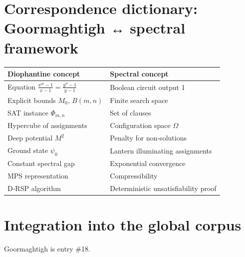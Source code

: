\documentclass[11pt,a4paper]{article}
\begin{document}
\section{Correspondence dictionary: Goormaghtigh ↔ spectral framework}

\begin{center}
\small
\begin{tabular}{@{}l|l@{}}
\toprule
\textbf{Diophantine concept} & \textbf{Spectral concept} \\
\midrule
Equation $\frac{x^{m}-1}{x-1} = \frac{y^{n}-1}{y-1}$ & Boolean circuit output 1 \\
Explicit bounds $M_0$, $B(m,n)$ & Finite search space \\
SAT instance $\Phi_{m,n}$ & Set of clauses \\
Hypercube of assignments & Configuration space $\Omega$ \\
Deep potential $M^2$ & Penalty for non‑solutions \\
Ground state $\psi_0$ & Lantern illuminating assignments \\
Constant spectral gap & Exponential convergence \\
MPS representation & Compressibility \\
D‑RSP algorithm & Deterministic unsatisfiability proof \\
\bottomrule
\end{tabular}
\end{center}

\section{Integration into the global corpus}

Goormaghtigh is entry \#18.
\end{document}
